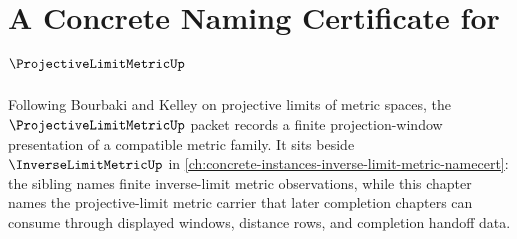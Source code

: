 \chapter{A Concrete Naming Certificate for $\ProjectiveLimitMetricUp$}
\label{ch:concrete-instances-projective-limit-metric-namecert}

Following Bourbaki and Kelley on projective limits of metric spaces, the $\ProjectiveLimitMetricUp$ packet records a finite projection-window presentation of a compatible metric family. It sits beside $\InverseLimitMetricUp$ in \autoref{ch:concrete-instances-inverse-limit-metric-namecert}: the sibling names finite inverse-limit metric observations, while this chapter names the projective-limit metric carrier that later completion chapters can consume through displayed windows, distance rows, and completion handoff data.

